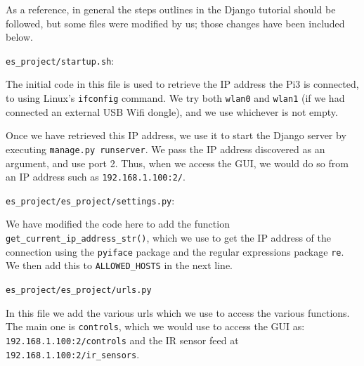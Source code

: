 
	
	As a reference, in general the steps outlines in the Django tutorial \cite{DjangoTutorial} should be followed, but some files were modified by us; those changes have been included below.
	
	\begin{description}[font=\quad $\circ$, topsep=6pt, itemsep=3em]
		\item \texttt{es\_project/startup.sh}:
		
			
			
			The initial code in this file is used to retrieve the IP address the Pi3 is connected, to using Linux's \texttt{ifconfig} command. We try both \texttt{wlan0} and \texttt{wlan1} (if we had connected an external USB Wifi dongle), and we use whichever is not empty. 
			
			Once we have retrieved this IP address, we use it to start the Django server by executing \texttt{manage.py runserver}. We pass the IP address discovered as an argument, and use port 2. Thus, when we access the GUI, we would do so from an IP address such as \texttt{192.168.1.100:2/}.
		
		
		
		\item \texttt{es\_project/es\_project/settings.py}:
			
			
			We have modified the code here to add the function \texttt{get\_current\_ip\_address\_str()}, which we use to get the IP address of the connection using the \texttt{pyiface} package and the regular expressions package \texttt{re}. We then add this to \texttt{ALLOWED\_HOSTS} in the next line.


		\clearpage
		\item \texttt{es\_project/es\_project/urls.py}		
			
			
			In this file we add the various urls which we use to access the various functions. The main one is \texttt{controls}, which we would use to access the GUI as: \texttt{192.168.1.100:2/controls} and the IR sensor feed at \texttt{192.168.1.100:2/ir\_sensors}.
			

\end{description}
